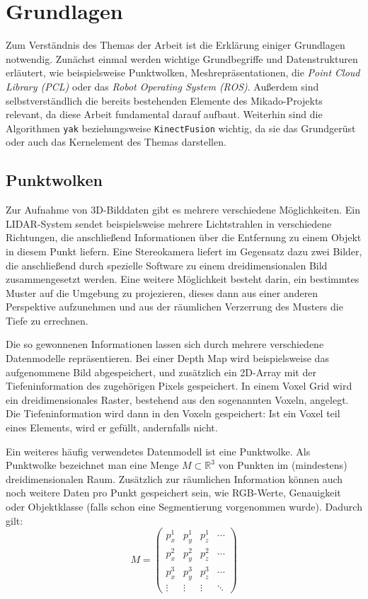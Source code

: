 
\chapter{Grundlagen}

Zum Verständnis des Themas der Arbeit ist die Erklärung einiger Grundlagen notwendig.
Zunächst einmal werden wichtige Grundbegriffe und Datenstrukturen erläutert, wie beispielsweise Punktwolken, Meshrepräsentationen, die \textit{Point Cloud Library (PCL)} oder das \textit{Robot Operating System (ROS)}.
Außerdem sind selbstverständlich die bereits bestehenden Elemente des Mikado-Projekts relevant, da diese Arbeit fundamental darauf aufbaut.
Weiterhin sind die Algorithmen \texttt{yak} beziehungsweise \texttt{KinectFusion} wichtig, da sie das Grundgerüst oder auch das Kernelement des Themas darstellen.


\section{Punktwolken}

Zur Aufnahme von 3D-Bilddaten gibt es mehrere verschiedene Möglichkeiten.
Ein LIDAR-System sendet beispielsweise mehrere Lichtstrahlen in verschiedene Richtungen, die anschließend Informationen über die Entfernung zu einem Objekt in diesem Punkt liefern.
Eine Stereokamera liefert im Gegensatz dazu zwei Bilder, die anschließend durch spezielle Software zu einem dreidimensionalen Bild zusammengesetzt werden.
Eine weitere Möglichkeit besteht darin, ein bestimmtes Muster auf die Umgebung zu projezieren, dieses dann aus einer anderen Perspektive aufzunehmen und aus der räumlichen Verzerrung des Musters die Tiefe zu errechnen.

Die so gewonnenen Informationen lassen sich durch mehrere verschiedene Datenmodelle repräsentieren.
Bei einer Depth Map wird beispielsweise das aufgenommene Bild abgespeichert, und zusätzlich ein 2D-Array mit der Tiefeninformation des zugehörigen Pixels gespeichert.
In einem Voxel Grid wird ein dreidimensionales Raster, bestehend aus den sogenannten Voxeln, angelegt.
Die Tiefeninformation wird dann in den Voxeln gespeichert: Ist ein Voxel teil eines Elements, wird er gefüllt, andernfalls nicht.

Ein weiteres häufig verwendetes Datenmodell ist eine Punktwolke.
Als Punktwolke bezeichnet man eine Menge $M \subset \mathbb{R}^3$ von Punkten im (mindestens) dreidimensionalen Raum.
Zusätzlich zur räumlichen Information können auch noch weitere Daten pro Punkt gespeichert sein, wie RGB-Werte, Genauigkeit oder Objektklasse (falls schon eine Segmentierung vorgenommen wurde).
Dadurch gilt:
$$M = \begin{pmatrix}
p_x^1 & p_y^1 & p_z^1 & \cdots\\
p_x^2 & p_y^2 & p_z^2 & \cdots\\
p_x^3 & p_y^3 & p_z^3 & \cdots\\
\vdots & \vdots & \vdots & \ddots
\end{pmatrix}$$

